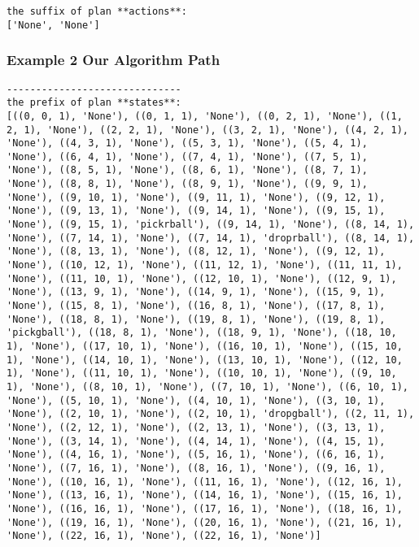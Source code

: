\begin{lstlisting}
the suffix of plan **actions**:
['None', 'None']
\end{lstlisting}

\subsubsection{Example 2 Our Algorithm Path}
\begin{lstlisting}
------------------------------
the prefix of plan **states**:
[((0, 0, 1), 'None'), ((0, 1, 1), 'None'), ((0, 2, 1), 'None'), ((1, 2, 1), 'None'), ((2, 2, 1), 'None'), ((3, 2, 1), 'None'), ((4, 2, 1), 'None'), ((4, 3, 1), 'None'), ((5, 3, 1), 'None'), ((5, 4, 1), 'None'), ((6, 4, 1), 'None'), ((7, 4, 1), 'None'), ((7, 5, 1), 'None'), ((8, 5, 1), 'None'), ((8, 6, 1), 'None'), ((8, 7, 1), 'None'), ((8, 8, 1), 'None'), ((8, 9, 1), 'None'), ((9, 9, 1), 'None'), ((9, 10, 1), 'None'), ((9, 11, 1), 'None'), ((9, 12, 1), 'None'), ((9, 13, 1), 'None'), ((9, 14, 1), 'None'), ((9, 15, 1), 'None'), ((9, 15, 1), 'pickrball'), ((9, 14, 1), 'None'), ((8, 14, 1), 'None'), ((7, 14, 1), 'None'), ((7, 14, 1), 'droprball'), ((8, 14, 1), 'None'), ((8, 13, 1), 'None'), ((8, 12, 1), 'None'), ((9, 12, 1), 'None'), ((10, 12, 1), 'None'), ((11, 12, 1), 'None'), ((11, 11, 1), 'None'), ((11, 10, 1), 'None'), ((12, 10, 1), 'None'), ((12, 9, 1), 'None'), ((13, 9, 1), 'None'), ((14, 9, 1), 'None'), ((15, 9, 1), 'None'), ((15, 8, 1), 'None'), ((16, 8, 1), 'None'), ((17, 8, 1), 'None'), ((18, 8, 1), 'None'), ((19, 8, 1), 'None'), ((19, 8, 1), 'pickgball'), ((18, 8, 1), 'None'), ((18, 9, 1), 'None'), ((18, 10, 1), 'None'), ((17, 10, 1), 'None'), ((16, 10, 1), 'None'), ((15, 10, 1), 'None'), ((14, 10, 1), 'None'), ((13, 10, 1), 'None'), ((12, 10, 1), 'None'), ((11, 10, 1), 'None'), ((10, 10, 1), 'None'), ((9, 10, 1), 'None'), ((8, 10, 1), 'None'), ((7, 10, 1), 'None'), ((6, 10, 1), 'None'), ((5, 10, 1), 'None'), ((4, 10, 1), 'None'), ((3, 10, 1), 'None'), ((2, 10, 1), 'None'), ((2, 10, 1), 'dropgball'), ((2, 11, 1), 'None'), ((2, 12, 1), 'None'), ((2, 13, 1), 'None'), ((3, 13, 1), 'None'), ((3, 14, 1), 'None'), ((4, 14, 1), 'None'), ((4, 15, 1), 'None'), ((4, 16, 1), 'None'), ((5, 16, 1), 'None'), ((6, 16, 1), 'None'), ((7, 16, 1), 'None'), ((8, 16, 1), 'None'), ((9, 16, 1), 'None'), ((10, 16, 1), 'None'), ((11, 16, 1), 'None'), ((12, 16, 1), 'None'), ((13, 16, 1), 'None'), ((14, 16, 1), 'None'), ((15, 16, 1), 'None'), ((16, 16, 1), 'None'), ((17, 16, 1), 'None'), ((18, 16, 1), 'None'), ((19, 16, 1), 'None'), ((20, 16, 1), 'None'), ((21, 16, 1), 'None'), ((22, 16, 1), 'None'), ((22, 16, 1), 'None')]

\end{lstlisting}
